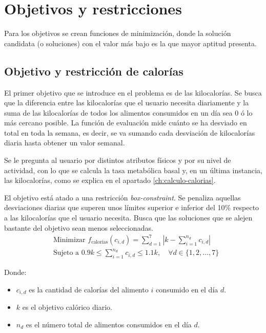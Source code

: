 \section{Objetivos y restricciones}
\label{ch:objetivo-restricciones}

Para los objetivos se crean funciones de minimización, donde la solución candidata (o soluciones) con el valor más bajo es la que mayor aptitud presenta.

\subsection{Objetivo y restricción de calorías}
\label{ch:objetivo-restriccion-calorias}

El primer objetivo que se introduce en el problema es de las kilocalorías. Se busca que la diferencia entre las kilocalorías que el usuario necesita diariamente y la suma de las kilocalorías de todos los alimentos consumidos en un día sea 0 ó lo más cercano posible. La función de evaluación mide cuánto se ha desviado en total en toda la semana, es decir, se va sumando cada desviación de kilocalorías diaria hasta obtener un valor semanal.

Se le pregunta al usuario por distintos atributos físicos y por su nivel de actividad, con lo que se calcula la tasa metabólica basal y, en un última instancia, las kilocalorías, como se explica en el apartado \ref{ch:calculo-calorias}.

El objetivo está atado a una restricción \textit{box-constraint}. Se penaliza aquellas desviaciones diarias que superen unos límites superior e inferior del 10\% respecto a las kilocalorías que el usuario necesita. Busca que las soluciones que se alejen bastante del objetivo sean menos seleccionadas.
\[
\begin{aligned}
& \text{Minimizar } f_{\text{calorías}}(c_{i,d}) = \sum_{d=1}^{7} \left| k - \sum_{i=1}^{n_d} c_{i,d} \right| \\
& \text{Sujeto a } 0.9k \leq \sum_{i=1}^{n_d} c_{i,d} \leq 1.1k, \quad \forall d \in \{1, 2, \ldots, 7\}
\end{aligned}
\]
\newpage
\begin{small}
    Donde:
    \begin{itemize}
    \item \( c_{i,d} \) es la cantidad de calorías del alimento \( i \) consumido en el día \( d \).
    \item \( k \) es el objetivo calórico diario.
    \item \( n_d \) es el número total de alimentos consumidos en el día \( d \).
    \end{itemize}
\end{small}



